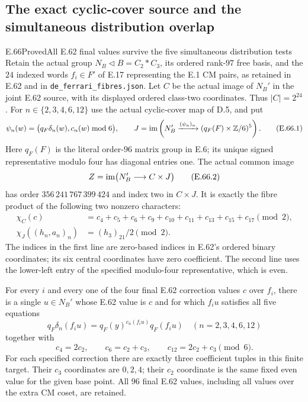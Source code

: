 \subsection{The exact cyclic-cover source and the simultaneous distribution overlap}

\begin{statement}{E.66}{Proved}{All E.62 final values survive the five simultaneous distribution tests}
Retain the actual group $N_B\triangleleft B=C_2*C_3$, its ordered
rank-$97$ free basis, and the $24$ indexed words $f_i\in F'$ of
E.17 representing the E.1 CM pairs, as retained in E.62 and in
\texttt{de\_ferrari\_fibres.json}.
Let $C$ be the actual image of $N_B'$ in the joint E.62 source,
with its displayed ordered class-two coordinates. Thus $|C|=2^{24}$.
For $n\in\{2,3,4,6,12\}$ use the actual cyclic-cover map of D.5,
and put
\[
 \psi_n(w)=\bigl(q_F\delta_n(w),c_n(w)\bmod6\bigr),\qquad
 J=\operatorname{im}\left(N_B'\xrightarrow{(\psi_n)_n}
                (q_F(F)\times\mathbb Z/6)^5\right).
 \tag{E.66.1}
\]
Here $q_F(F)$ is the literal order-$96$ matrix group in E.6;
its unique signed representative modulo four has diagonal entries one.
The actual common image
\[
 Z=\operatorname{im}\bigl(N_B'\longrightarrow C\times J\bigr)
 \tag{E.66.2}
\]
has order $356\,241\,767\,399\,424$ and index two in $C\times J$.
It is exactly the fibre product of the following two nonzero characters:
\[
 \begin{split}
 \chi_C(c)&=c_4+c_5+c_6+c_9+c_{10}+c_{11}
                   +c_{13}+c_{15}+c_{17}\pmod2,\\
 \chi_J((h_n,a_n)_n)&=(h_3)_{21}/2\pmod2.
 \end{split}
 \tag{E.66.3}
\]
The indices in the first line are zero-based indices in E.62's
ordered binary coordinates; its six central coordinates have zero
coefficient. The second line uses the lower-left entry of the
specified modulo-four representative, which is even.

For every $i$ and every one of the four final E.62 correction
values $c$ over $f_i$, there is a single $u\in N_B'$ whose E.62
value is $c$ and for which $f_i u$ satisfies all five equations
\[
 q_F\delta_n(f_i u)=q_F(y)^{c_n(f_i u)}q_F(f_i u)
 \quad(n=2,3,4,6,12)
 \tag{E.66.4}
\]
together with
\[
 c_4=2c_2,\qquad c_6=c_2+c_3,\qquad
 c_{12}=2c_2+c_3\pmod6.
 \tag{E.66.5}
\]
For each specified correction there are exactly three coefficient
tuples in this finite target. Their $c_3$ coordinates are $0,2,4$;
their $c_2$ coordinate is the same fixed even value for the given
base point. All $96$ final E.62 values, including all values over
the extra CM coset, are retained.


\end{statement}
